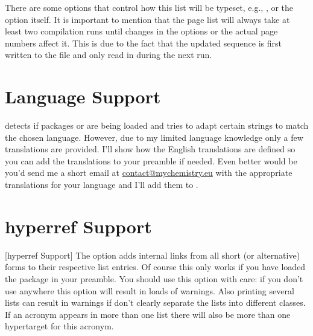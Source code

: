 \documentclass[DIV10,toc=index,toc=bib,hyperfootnotes=false]{cnpkgdoc}
\begin{document}
There are some options that control how this list will be typeset, e.g.,
,  or the option  itself. It is
important to mention that the page list will always take at least two compilation
runs until changes in the options or the actual page numbers affect it. This is
due to the fact that the updated sequence is first written to the  file
and only read in during the next run.

\section{Language Support}
\acro detects if packages  or  are being loaded
and tries to adapt certain strings to match the chosen language. However, due
to my limited language knowledge only a few translations are provided. I'll
show how the English translations are defined so you can add the translations
to your preamble if needed. Even better would be you'd send me a short email
at \href{mailto:contact@mychemistry.eu}{contact@mychemistry.eu} with the
appropriate translations for your language and I'll add them to \acro.

\begin{beispiel}
\end{beispiel}

\section{hyperref Support}[hyperref Support]
The option  adds internal links from all short (or alternative)
forms to their respective list entries. Of course this only works if you have
loaded the  package in your preamble. You should use this option
with care: if you don't use  anywhere this option will result
in loads of  warnings. Also printing several lists can result in
warnings if don't clearly separate the lists into different classes. If an acronym
appears in more than one list there will also be more than one hypertarget for this
acronym.
\end{document}

